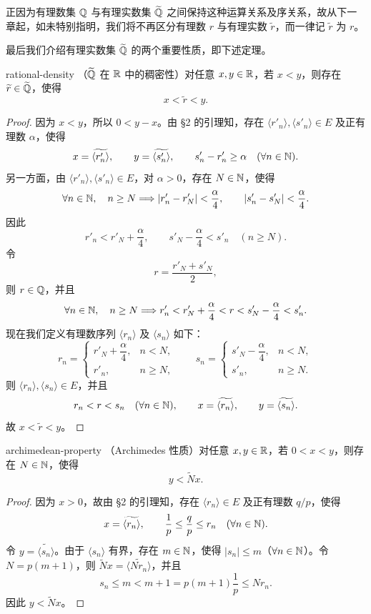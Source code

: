 正因为有理数集 \(\mathbb{Q}\) 与有理实数集 \(\widetilde{\mathbb{Q}}\) 之间保持这种运算关系及序关系，故从下一章起，如未特别指明，我们将不再区分有理数 \(r\) 与有理实数
\(\widetilde r\)，而一律记 \(\widetilde r\) 为 \(r\)。

最后我们介绍有理实数集 \(\widetilde{\mathbb{Q}}\) 的两个重要性质，即下述定理。

\begin{mythm}{}{rational-density}
（\(\widetilde{\mathbb{Q}}\) 在 \(\mathbb{R}\) 中的稠密性）对任意 \(x,y\in\mathbb{R}\)，若
\(x<y\)，则存在 \(\widetilde r\in\widetilde{\mathbb{Q}}\)，使得
\[
x<\widetilde r<y.
\]
\end{mythm}

\begin{proof}
因为 \(x<y\)，所以 \(0<y-x\)。由 §2 的引理知，存在
\(\langle r'_n\rangle,\langle s'_n\rangle\in E\) 及正有理数 \(\alpha\)，使得
\[
x=\widetilde{\langle r'_n\rangle},
\qquad
y=\widetilde{\langle s'_n\rangle},
\qquad
s'_n-r'_n\geq\alpha\quad(\forall n\in\mathbb{N}).
\]
另一方面，由 \(\langle r'_n\rangle,\langle s'_n\rangle\in E\)，对
\(\alpha>0\)，存在 \(N\in\mathbb{N}\)，使得
\[
\forall n\in\mathbb{N},\quad n\geq N
\Longrightarrow
|r'_n-r'_N|<\frac{\alpha}{4},
\qquad
|s'_n-s'_N|<\frac{\alpha}{4}.
\]
因此
\[
r'_n<r'_N+\frac{\alpha}{4},
\qquad
s'_N-\frac{\alpha}{4}<s'_n
\quad(n\geq N).
\]
令
\[
r=\frac{r'_N+s'_N}{2},
\]
则 \(r\in\mathbb{Q}\)，并且
\[
\forall n\in\mathbb{N},\quad n\geq N
\Longrightarrow
r'_n<r'_N+\frac{\alpha}{4}<r
<s'_N-\frac{\alpha}{4}<s'_n.
\]
现在我们定义有理数序列 \(\langle r_n\rangle\) 及 \(\langle s_n\rangle\) 如下：
\[
r_n=
\begin{cases}
r'_N+\dfrac{\alpha}{4},&n<N,\\
r'_n,&n\geq N,
\end{cases}
\qquad
s_n=
\begin{cases}
s'_N-\dfrac{\alpha}{4},&n<N,\\
s'_n,&n\geq N.
\end{cases}
\]
则 \(\langle r_n\rangle,\langle s_n\rangle\in E\)，并且
\[
r_n<r<s_n\quad(\forall n\in\mathbb{N}),
\qquad
x=\widetilde{\langle r_n\rangle},
\qquad
y=\widetilde{\langle s_n\rangle}.
\]
故 \(x<\widetilde r<y\)。
\end{proof}

\begin{mythm}{}{archimedean-property}
（Archimedes 性质）对任意 \(x,y\in\mathbb{R}\)，若 \(0<x<y\)，则存在
\(N\in\mathbb{N}\)，使得
\[
y<\widetilde N x.
\]
\end{mythm}

\begin{proof}
因为 \(x>0\)，故由 §2 的引理知，存在 \(\langle r_n\rangle\in E\) 及正有理数
\(q/p\)，使得
\[
x=\widetilde{\langle r_n\rangle},
\qquad
\frac{1}{p}\leq\frac{q}{p}\leq r_n
\quad(\forall n\in\mathbb{N}).
\]
令 \(y=\widetilde{\langle s_n\rangle}\)。由于 \(\langle s_n\rangle\) 有界，存在
\(m\in\mathbb{N}\)，使得 \(|s_n|\leq m\)（\(\forall n\in\mathbb{N}\)）。令
\(N=p(m+1)\)，则
\(\widetilde N x=\widetilde{\langle Nr_n\rangle}\)，并且
\[
s_n\leq m<m+1=p(m+1)\frac{1}{p}\leq Nr_n.
\]
因此 \(y<\widetilde N x\)。
\end{proof}

